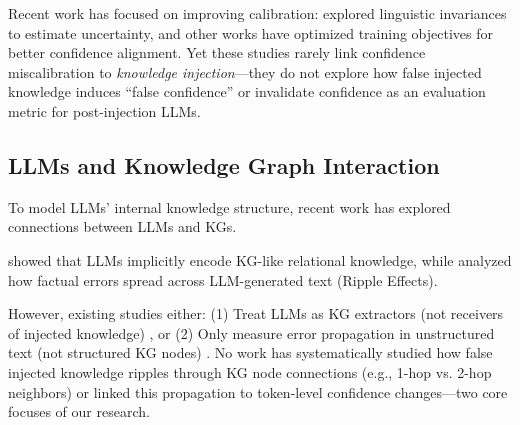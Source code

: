 Recent work has focused on improving calibration: \citet{kuhn2023semantic} explored linguistic invariances to estimate uncertainty, and other works have optimized training objectives for better confidence alignment. Yet these studies rarely link confidence miscalibration to \emph{knowledge injection}—they do not explore how false injected knowledge induces ``false confidence'' or invalidate confidence as an evaluation metric for post-injection LLMs.

\subsection{LLMs and Knowledge Graph Interaction}
To model LLMs' internal knowledge structure, recent work has explored connections between LLMs and KGs. 

\citet{dai2022kn} showed that LLMs implicitly encode KG-like relational knowledge, while \citet{cohen2023ripple} analyzed how factual errors spread across LLM-generated text (Ripple Effects). 

However, existing studies either: (1) Treat LLMs as KG extractors (not receivers of injected knowledge) \cite{bosselut2019comet}, or (2) Only measure error propagation in unstructured text (not structured KG nodes) \cite{cohen2023ripple, yao2023editing}. No work has systematically studied how false injected knowledge ripples through KG node connections (e.g., 1-hop vs. 2-hop neighbors) or linked this propagation to token-level confidence changes—two core focuses of our research.